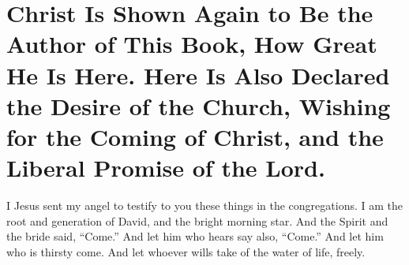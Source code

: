 \chapter[Sermon 100. Christ Is Shown Again to Be the Author of This Book, How Great He Is Here. Here Is Also Declared the Desire of the Church, Wishing for the Coming of Christ, and the Liberal Promise of the Lord.]{Christ Is Shown Again to Be the Author of This Book, How Great He Is Here. Here Is Also Declared the Desire of the Church, Wishing for the Coming of Christ, and the Liberal Promise of the Lord.}
\label{sermon:100}

I Jesus sent my angel to testify to you these things in the congregations. I am the root and generation of David, and the bright morning star. And the Spirit and the bride said, “Come.” And let him who hears say also, “Come.” And let him who is thirsty come. And let whoever wills take of the water of life, freely.


